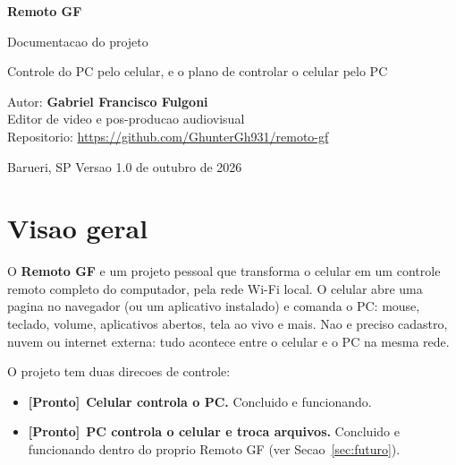 \documentclass[11pt,a4paper]{article}
\newcommand{\feito}{\textcolor{laranja}{\textbf{[Pronto]}}\ }
\begin{document}
\begin{titlepage}
\centering
\vspace*{3cm}
{\Huge\bfseries\color{laranja} Remoto GF\par}
\vspace{0.6cm}
{\LARGE\color{grafite} Documentacao do projeto\par}
\vspace{0.4cm}
{\large\color{cinza} Controle do PC pelo celular, e o plano de controlar o celular pelo PC\par}
\vspace{2cm}
\begin{tcolorbox}[colback=fundo,colframe=laranja,width=0.8\textwidth,halign=center,arc=4pt]
\large Autor: \textbf{Gabriel Francisco Fulgoni}\\[4pt]
Editor de video e pos-producao audiovisual\\[4pt]
Repositorio: \url{https://github.com/GhunterGh931/remoto-gf}
\end{tcolorbox}
\vfill
{\color{cinza} Barueri, SP \quad\textbullet\quad Versao 1.0 \quad\textbullet{} de outubro de 2026\par}
\end{titlepage}

\tableofcontents
\newpage

\section{Visao geral}

O \textbf{Remoto GF} e um projeto pessoal que transforma o celular em um controle
remoto completo do computador, pela rede Wi-Fi local. O celular abre uma pagina
no navegador (ou um aplicativo instalado) e comanda o PC: mouse, teclado, volume,
aplicativos abertos, tela ao vivo e mais. Nao e preciso cadastro, nuvem ou internet
externa: tudo acontece entre o celular e o PC na mesma rede.

O projeto tem duas direcoes de controle:

\begin{itemize}
  \item \feito \textbf{Celular controla o PC.} Concluido e funcionando.
  \item \feito \textbf{PC controla o celular e troca arquivos.} Concluido e funcionando
  dentro do proprio Remoto GF (ver Secao~\ref{sec:futuro}).
\end{itemize}
\end{document}
